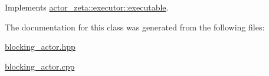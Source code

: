 Implements \hyperlink{structactor__zeta_1_1executor_1_1executable_a61d6cbce8b124e1e5ef80f8befea2a89}{actor\+\_\+zeta\+::executor\+::executable}.



The documentation for this class was generated from the following files\+:\begin{DoxyCompactItemize}
\item 
\hyperlink{blocking__actor_8hpp}{blocking\+\_\+actor.\+hpp}\item 
\hyperlink{blocking__actor_8cpp}{blocking\+\_\+actor.\+cpp}\end{DoxyCompactItemize}

